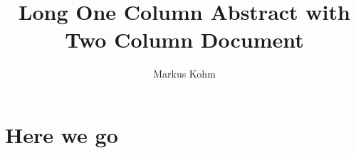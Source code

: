 \documentclass[twocolumn]{article}
\begin{document}
\title{Long One Column Abstract with Two Column Document}
\author{Markus Kohm}

\longtwocolumn[{
 \maketitle
 \begin{abstract}
 \kant[1-6]
 \end{abstract}
 \vskip\baselineskip
 }]
 \section{Here we go}
 \kant[1-7]
 
\end{document}
